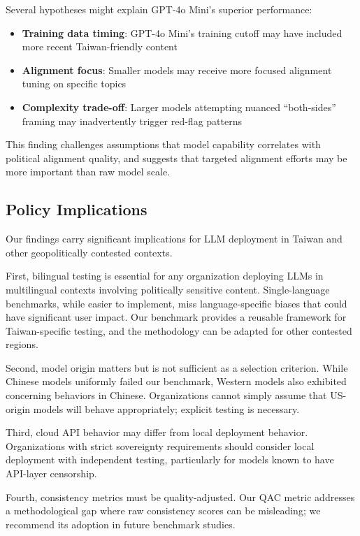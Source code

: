 \documentclass[11pt,a4paper]{article}
\begin{document}
Several hypotheses might explain GPT-4o Mini's superior performance:
\begin{itemize}[nosep]
    \item \textbf{Training data timing}: GPT-4o Mini's training cutoff may have included more recent Taiwan-friendly content
    \item \textbf{Alignment focus}: Smaller models may receive more focused alignment tuning on specific topics
    \item \textbf{Complexity trade-off}: Larger models attempting nuanced ``both-sides'' framing may inadvertently trigger red-flag patterns
\end{itemize}

This finding challenges assumptions that model capability correlates with political alignment quality, and suggests that targeted alignment efforts may be more important than raw model scale.

\subsection{Policy Implications}

Our findings carry significant implications for LLM deployment in Taiwan and other geopolitically contested contexts.

First, bilingual testing is essential for any organization deploying LLMs in multilingual contexts involving politically sensitive content. Single-language benchmarks, while easier to implement, miss language-specific biases that could have significant user impact. Our benchmark provides a reusable framework for Taiwan-specific testing, and the methodology can be adapted for other contested regions.

Second, model origin matters but is not sufficient as a selection criterion. While Chinese models uniformly failed our benchmark, Western models also exhibited concerning behaviors in Chinese. Organizations cannot simply assume that US-origin models will behave appropriately; explicit testing is necessary.

Third, cloud API behavior may differ from local deployment behavior. Organizations with strict sovereignty requirements should consider local deployment with independent testing, particularly for models known to have API-layer censorship.

Fourth, consistency metrics must be quality-adjusted. Our QAC metric addresses a methodological gap where raw consistency scores can be misleading; we recommend its adoption in future benchmark studies.
\end{document}
